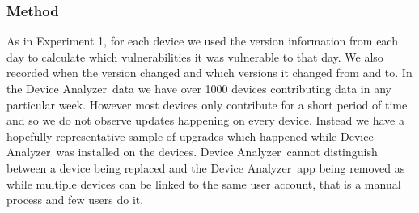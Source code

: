 \documentclass[conference,a4paper,twoside]{IEEEtran}
\newcommand{\da}{Device Analyzer}
\begin{document}
\subsubsection{Method}
As in Experiment 1, for each device we used the version information from each day to calculate which vulnerabilities it was vulnerable to that day.
We also recorded when the version changed and which versions it changed from and to.
In the \da\ data we have over 1000 devices contributing data in any particular week.
However most devices only contribute for a short period of time and so we do not observe updates happening on every device.
Instead we have a hopefully representative sample of upgrades which happened while \da\ was installed on the devices.
\da\ cannot distinguish between a device being replaced and the \da\ app being removed as while multiple devices can be linked to the same user account, that is a manual process and few users do it.
\end{document}
